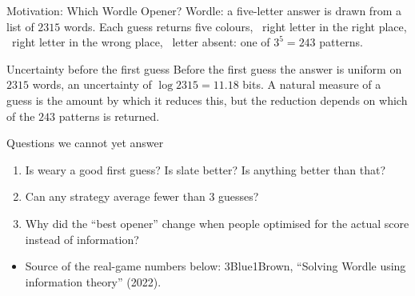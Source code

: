 \begin{frame}{Motivation: Which Wordle Opener?}
  \small
  Wordle: a five-letter answer is drawn from a list of $2315$ words. Each guess returns five colours, \cG\ right letter in the right place, \cY\ right letter in the wrong place, \cB\ letter absent: one of $3^5=243$ patterns.
  \begin{block}{Uncertainty before the first guess}
    Before the first guess the answer is uniform on $2315$ words, an uncertainty of $\log2315=11.18$ bits. A natural measure of a guess is the amount by which it reduces this, but the reduction depends on which of the $243$ patterns is returned.
  \end{block}
  \begin{block}{Questions we cannot yet answer}
    \begin{enumerate}
      \item Is \textsf{weary} a good first guess? Is \textsf{slate} better? Is anything better than that?
      \item Can any strategy average fewer than $3$ guesses?
      \item Why did the ``best opener'' change when people optimised for the actual score instead of information?
    \end{enumerate}
  \end{block}
  \begin{itemize}
    \item Source of the real-game numbers below: 3Blue1Brown, ``Solving Wordle using information theory'' (2022).
  \end{itemize}
\end{frame}

